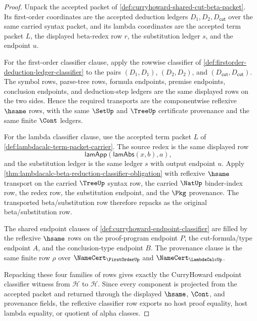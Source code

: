 \begin{proof}
Unpack the accepted packet of \autoref{def:curryhoward-shared-cut-beta-packet}.
Its first-order coordinates are the accepted deduction ledgers
$D_1,D_2,D_{\mathsf{cut}}$ over the same carried syntax packet, and its lambda
coordinates are the accepted term packet $L$, the displayed beta-redex row $r$,
the substitution ledger $s$, and the endpoint $u$.

For the first-order classifier clause, apply the rowwise classifier of
\autoref{def:firstorder-deduction-ledger-classifier} to the pairs
$(D_1,D_1)$, $(D_2,D_2)$, and $(D_{\mathsf{cut}},D_{\mathsf{cut}})$. The symbol
rows, parse-tree rows, formula endpoints, premise endpoints, conclusion
endpoints, and deduction-step ledgers are the same displayed rows on the two
sides. Hence the required transports are the componentwise reflexive $\hsame$
rows, with the same $\SetUp$ and $\TreeUp$ certificate provenance and the same
finite $\Cont$ ledgers.

For the lambda classifier clause, use the accepted term packet
$L$ of \autoref{def:lambdacalc-term-packet-carrier}. The source redex is the
same displayed row
$$
\mathsf{lamApp}(\mathsf{lamAbs}(x,b),a),
$$
and the substitution ledger is the same ledger $s$ with output endpoint $u$.
Apply \autoref{thm:lambdacalc-beta-reduction-classifier-obligation} with
reflexive $\hsame$ transport on the carried $\TreeUp$ syntax row, the carried
$\NatUp$ binder-index row, the redex row, the substitution endpoint, and the
$\Pkg$ provenance. The transported beta/substitution row therefore repacks as
the original beta/substitution row.

The shared endpoint clauses of
\autoref{def:curryhoward-endpoint-classifier} are filled by the reflexive
$\hsame$ rows on the proof-program endpoint $P$, the cut-formula/type endpoint
$A$, and the conclusion-type endpoint $B$. The provenance clause is the same
finite row $\rho$ over $\NameCert_{\FirstOrderUp}$ and
$\NameCert_{\LambdaCalcUp}$.

Repacking these four families of rows gives exactly the CurryHoward endpoint
classifier witness from $\mathcal H$ to $\mathcal H$. Since every component is
projected from the accepted packet and returned through the displayed
$\hsame$, $\Cont$, and provenance fields, the reflexive classifier row exports
no host proof equality, host lambda equality, or quotient of alpha classes.
\end{proof}

